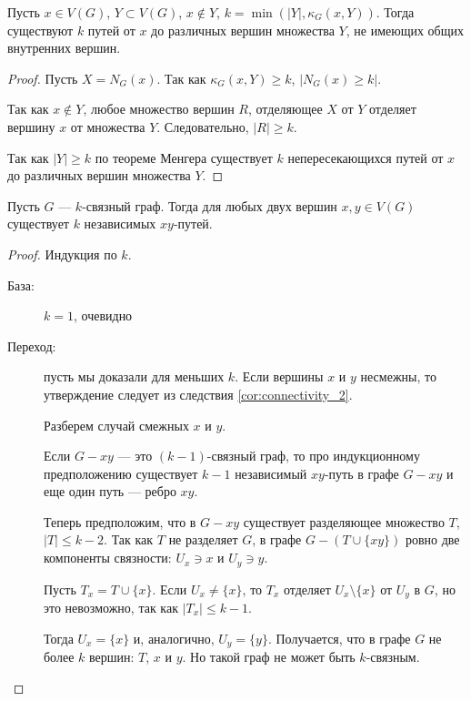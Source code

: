 \begin{corollary}\label{cor:connectivity_2}
    Пусть $x \in  V(G)$, $Y \subset V(G)$, $x \notin Y$, $k = \min(\lvert Y \rvert, \kappa_G(x, Y))$. Тогда существуют $k$ путей от $x$ до различных вершин множества $Y$, не имеющих  общих внутренних вершин.
\end{corollary}
\begin{proof}
    Пусть $X = N_{G}(x)$. Так как $\kappa_G(x, Y) \ge k$, $\lvert N_{G}(x) \ge k \rvert$.

	Так как $x\notin Y$, любое множество вершин $R$, отделяющее $X$ от $Y$ отделяет вершину $x$ от множества $Y$. Следовательно, $\lvert R \rvert \ge k$.

	Так как $\lvert Y \rvert \ge k$ по теореме Менгера существует  $k$ непересекающихся путей от $x$ до различных вершин множества $Y$.
\end{proof}

\begin{theorem}[Уитни, 1932]
	Пусть $G$ --- $k$-связный граф. Тогда для любых двух вершин $x , y \in V(G)$ существует $k$ независимых $xy$-путей.
\end{theorem}
\begin{proof}
    Индукция по $k$. 
	\begin{description}
		\item[База:] $k=1$, очевидно
		\item[Переход:] пусть мы доказали для меньших $k$. Если вершины $x$ и $y$ несмежны, то утверждение следует из следствия \ref{cor:connectivity_2}.

			Разберем случай смежных $x$ и $y$.

			Если $G - xy$  --- это $(k-1)$-связный граф, то про индукционному предположению существует $k-1$ независимый $xy$-путь в графе $G-xy$ и еще один путь --- ребро $xy$.

			Теперь предположим, что в $G-xy$  существует разделяющее множество $T$, $\lvert T \rvert \le k-2$. Так как $T$ не разделяет $G$, в графе $G - (T \cup \{xy\})$ ровно две компоненты связности: $U_x \ni x$ и $U_y \ni y$.

			Пусть $T_x = T \cup \{x\}$. Если $U_x \neq \{x\}$, то $T_x$ отделяет $U_x \setminus \{x\}$ от $U_y$ в $G$, но это невозможно, так как $\lvert T_x \rvert \le  k-1$.

			Тогда $U_x = \{x\}$ и, аналогично, $U_y = \{y\}$. Получается, что в графе $G$ не более $k$ вершин: $T$, $x$ и $y$. Но такой граф не может быть $k$-связным.
	\end{description}
\end{proof}

